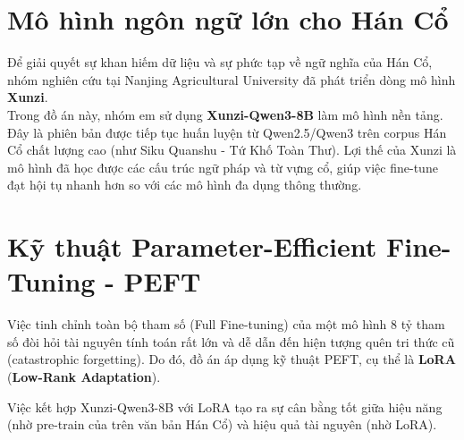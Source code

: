 \section{Mô hình ngôn ngữ lớn cho Hán Cổ}
Để giải quyết sự khan hiếm dữ liệu và sự phức tạp về ngữ nghĩa của Hán Cổ, nhóm nghiên cứu tại Nanjing Agricultural University đã phát triển dòng mô hình \textbf{Xunzi}.
\\
Trong đồ án này, nhóm em sử dụng \textbf{Xunzi-Qwen3-8B} làm mô hình nền tảng. Đây là phiên bản được tiếp tục huấn luyện từ Qwen2.5/Qwen3 trên corpus Hán Cổ chất lượng cao (như Siku Quanshu - Tứ Khố Toàn Thư). Lợi thế của Xunzi là mô hình đã học được các cấu trúc ngữ pháp và từ vựng cổ, giúp việc fine-tune đạt hội tụ nhanh hơn so với các mô hình đa dụng thông thường.

\section{Kỹ thuật Parameter-Efficient Fine-Tuning - PEFT}

Việc tinh chỉnh toàn bộ tham số (Full Fine-tuning) của một mô hình 8 tỷ tham số đòi hỏi tài nguyên tính toán rất lớn và dễ dẫn đến hiện tượng quên tri thức cũ (catastrophic forgetting). Do đó, đồ án áp dụng kỹ thuật PEFT, cụ thể là \textbf{LoRA} (\textbf{Low-Rank Adaptation}).



Việc kết hợp Xunzi-Qwen3-8B với LoRA tạo ra sự cân bằng tốt giữa hiệu năng (nhờ pre-train của trên văn bản Hán Cổ) và hiệu quả tài nguyên (nhờ LoRA).
